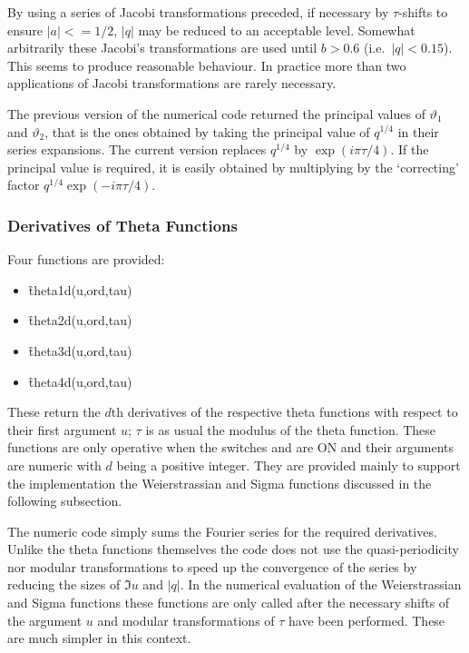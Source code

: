 By using a series of Jacobi transformations preceded, if necessary by
$\tau$-shifts to ensure $|a| <= 1/2$, $|q|$ may be reduced to an acceptable
level. Somewhat arbitrarily these Jacobi's transformations are used
until $b > 0.6$ (i.e.~$|q| < 0.15$). This seems to produce reasonable
behaviour. In practice more than two applications of Jacobi transformations
are rarely necessary.

The previous version of the numerical code returned the principal values
of $\vartheta_1$ and $\vartheta_2$, that is the ones obtained by taking
the principal value of $q^{1/4}$ in their series expansions. The current version replaces
$q^{1/4}$ by $\exp(i\pi\tau/4)$.  If the principal value is required, it is easily obtained
by multiplying by the `correcting' factor $q^{1/4}\exp(-i\pi\tau/4)$.

\subsubsection{Derivatives of Theta Functions}

\hypertarget{THETAD}{}
\hypertarget{operator:THETA1D}{}
\hypertarget{operator:THETA2D}{}
\hypertarget{operator:THETA3D}{}
\hypertarget{operator:THETA4D}{}
 
Four functions are provided:
\begin{itemize}
\item \f{theta1d(u,ord,tau)}
\item \f{theta2d(u,ord,tau)}
\item \f{theta3d(u,ord,tau)}
\item \f{theta4d(u,ord,tau)}
\end{itemize}
These return the $d$th derivatives of the respective theta functions
with respect to their first argument $u$; $\tau$ is as usual the modulus
of the theta function. These functions are only operative when the switches
 and  are ON and their arguments are numeric with
$d$ being a positive integer.  They are provided mainly to support the implementation
the Weierstrassian and Sigma functions discussed in the following subsection.

The numeric code simply sums the Fourier series for the required derivatives.
Unlike the theta functions themselves the code does not use the quasi-periodicity nor
modular transformations to speed  up the convergence of the series by reducing the sizes
of $\Im u$ and $|q|$.  In the numerical evaluation of the Weierstrassian and Sigma functions
these functions are only called after the necessary shifts of the argument $u$ and modular
transformations of $\tau$ have been performed. These are much simpler in this context.

